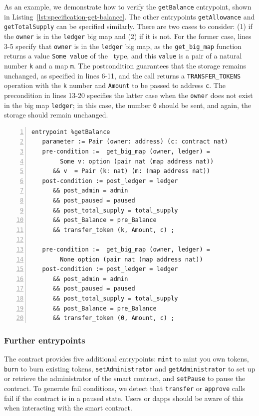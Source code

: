 \documentclass[a4paper,USenglish,cleveref, autoref,anonymous]{lipics-v2021}
\begin{document}
As an example, we demonstrate how to verify the \lstinline/getBalance/
entrypoint,  shown in Listing~\ref{lst:specification-get-balance}. The
other entrypoints \lstinline/getAllowance/ and
\lstinline/getTotalSupply/ can be specified similarly.  There are two
cases to consider: (1) if the \lstinline/owner/ is in the
\lstinline/ledger/ big map and (2) if it is not. For the former case,
lines 3-5 specify that \lstinline/owner/ is in the \lstinline/ledger/
big map, as the \lstinline/get_big_map/ function returns a value
\lstinline/Some value/ of the \TOPTION\ type, and this
\lstinline/value/ is a pair of a natural number \lstinline/k/ and a
map \lstinline/m/. The postcondition guarantees that the storage
remains unchanged, as specified in lines 6-11, and the call returns a
\lstinline/TRANSFER_TOKENS/ operation with the \lstinline/k/ number
and \lstinline/Amount/ to be passed to address \lstinline/c/. The
precondition in lines 13-20 specifies the latter case when the
\lstinline/owner/ does not exist in the big map \lstinline/ledger/; in
this case, the number \lstinline/0/ should be sent, and again, the
storage should remain unchanged. 

\begin{lstlisting}[float=tp,captionpos=b,caption={Specification of the \lstinline/getBalance/ entrypoint},label={lst:specification-get-balance},numbers=left]
entrypoint %getBalance
   parameter := Pair (owner: address) (c: contract nat)
   pre-condition :=  get_big_map (owner, ledger) = 
        Some v: option (pair nat (map address nat)) 
      && v  = Pair (k: nat) (m: (map address nat))
   post-condition := post_ledger = ledger 
      && post_admin = admin 
      && post_paused = paused 
      && post_total_supply = total_supply 
      && post_Balance = pre_Balance 
      && transfer_token (k, Amount, c) ;

   pre-condition :=  get_big_map (owner, ledger) = 
        None option (pair nat (map address nat)) 
   post-condition := post_ledger = ledger 
      && post_admin = admin 
      && post_paused = paused 
      && post_total_supply = total_supply 
      && post_Balance = pre_Balance 
      && transfer_token (0, Amount, c) ;
\end{lstlisting}
\subsubsection{Further entrypoints}
\label{sec:other-entrypoints}

The contract provides five additional entrypoints: \lstinline/mint/ to
mint you own tokens, \lstinline/burn/ to burn existing tokens,
\lstinline/setAdministrator/ and \lstinline/getAdministrator/ to set
up or retrieve the administrator of the smart contract, and
\lstinline/setPause/ to pause the contract. To generate fail
conditions, we detect that \lstinline/transfer/ or \lstinline/approve/
calls fail if the contract is in a paused state. Users or dapps should
be aware of this when interacting with the smart contract. 
\end{document}
